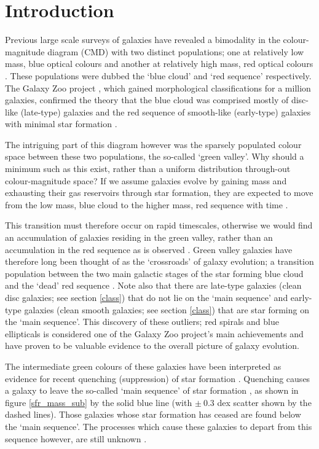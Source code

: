\documentclass{mn2e}
\begin{document}
\section{Introduction}
Previous large scale surveys of galaxies have revealed a bimodality in the colour-magnitude diagram (CMD) with two distinct populations; one at relatively low mass, blue optical colours and another at relatively high mass, red optical colours \citep{Baldry04, Baldry06, Willmer06, Brammer09}. These populations were dubbed the `blue cloud' and `red sequence' respectively. The Galaxy Zoo project \citep{Lintott09, Lintott11}, which gained morphological classifications for a million galaxies, confirmed the theory that the blue cloud was comprised mostly of disc-like (late-type) galaxies and the red sequence of smooth-like (early-type) galaxies with minimal star formation \citep{Bamford09, Skibba09}. 

The intriguing part of this diagram however was the sparsely populated colour space between these two populations, the so-called `green valley'. Why should a minimum such as this exist, rather than a uniform distribution through-out colour-magnitude space? If we assume galaxies evolve by gaining mass and exhausting their gas reservoirs through star formation, they are expected to move from the low mass, blue cloud to the higher mass, red sequence with time \citep{Salim07}. 

This transition must therefore occur on rapid timescales, otherwise we would find an accumulation of galaxies residing in the green valley, rather than an accumulation in the red sequence as is observed \citep{Arnouts07, Martin07}. Green valley galaxies have therefore long been thought of as the `crossroads' of galaxy evolution; a transition population between the two main galactic stages of the star forming blue cloud and the `dead' red sequence \citep{Bell04, Wyder07, Schim07, Martin07, Faber07, Mendez11, Gonc12, Sch2014}. Note also that there are late-type galaxies (clean disc galaxies; see section \ref{class}) that do not lie on the `main sequence' and early-type galaxies (clean smooth galaxies; see section \ref{class}) that are star forming on the `main sequence'. This discovery of these outliers; red spirals \citep{Masters10} and blue ellipticals \citep{Sch09} is considered one of the Galaxy Zoo project's main achievements and have proven to be valuable evidence to the overall picture of galaxy evolution. 

The intermediate green colours of these galaxies have been interpreted as evidence for recent quenching (suppression) of star formation \citep{Salim07}. Quenching causes a galaxy to leave the so-called `main sequence' of star formation \citep{Noeske07, Peng}, as shown in figure \ref{sfr_mass_sub} by the solid blue line (with $\pm ~0.3$ dex scatter shown by the dashed lines). Those galaxies whose star formation has ceased are found below the `main sequence'. The processes which cause these galaxies to depart from this sequence however, are still unknown \citep{Salim07, Peng, Elbaz11, Lee12} .
\end{document}
